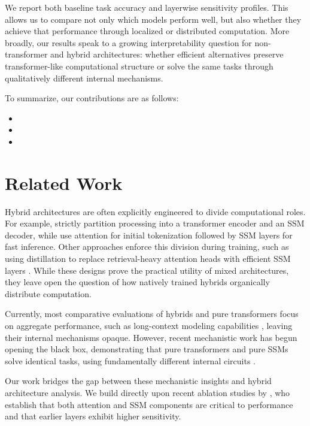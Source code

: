 \documentclass{article}
\begin{document}
We report both baseline task accuracy and layerwise sensitivity profiles. 
This allows us to compare not only which models perform well, but also whether they achieve that performance through localized or distributed computation. 
More broadly, our results speak to a growing interpretability question for non-transformer and hybrid architectures: 
whether efficient alternatives preserve transformer-like computational structure or solve the same tasks through qualitatively different internal mechanisms.

To summarize, our contributions are as follows:
\begin{itemize}
    \item{}
	\item{}
    \item{}
\end{itemize}




\section{Related Work}
\label{sec:rw}
Hybrid architectures are often explicitly engineered to divide computational roles. For example, \cite{Zhu2025} strictly partition processing into a transformer encoder and an SSM decoder, while \cite{ryoo2025generalizablerealtimeneuraldecoding} use attention for initial tokenization followed by SSM layers for fast inference. Other approaches enforce this division during training, such as using distillation to replace retrieval-heavy attention heads with efficient SSM layers \cite{bick2026retrievalawaredistillationtransformerssmhybrids}. While these designs prove the practical utility of mixed architectures, they leave open the question of how natively trained hybrids organically distribute computation.

Currently, most comparative evaluations of hybrids and pure transformers focus on aggregate performance, such as long-context modeling capabilities \cite{wornow2025contextcluesevaluatinglong}, leaving their internal mechanisms opaque. However, recent mechanistic work has begun opening the black box, demonstrating that pure transformers and pure SSMs solve identical tasks, using fundamentally different internal circuits \cite{arora2026mechanisticevaluationtransformersstate}.

Our work bridges the gap between these mechanistic insights and hybrid architecture analysis. We build directly upon recent ablation studies by \cite{borobia2026functionalcomponentablationreveals}, who establish that both attention and SSM components are critical to performance and that earlier layers exhibit higher sensitivity.
\end{document}
